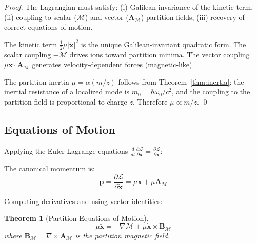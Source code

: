 \documentclass[twocolumn,10pt,a4paper]{article}
\newtheorem{theorem}{Theorem}[section]
\theoremstyle{definition}
\theoremstyle{remark}
\newcommand{\Depth}{\mathcal{M}}
\newcommand{\Lagr}{\mathcal{L}}
\newcommand{\Apartition}{\mathbf{A}_{\mathcal{M}}}
\newcommand{\partinert}{\mu}
\begin{document}
\begin{proof}
The Lagrangian must satisfy: (i) Galilean invariance of the kinetic term, (ii) coupling to scalar ($\Depth$) and vector ($\Apartition$) partition fields, (iii) recovery of correct equations of motion.

The kinetic term $\frac{1}{2}\partinert|\dot{\mathbf{x}}|^2$ is the unique Galilean-invariant quadratic form. The scalar coupling $-\Depth$ drives ions toward partition minima. The vector coupling $\partinert\dot{\mathbf{x}}\cdot\Apartition$ generates velocity-dependent forces (magnetic-like).

The partition inertia $\partinert = \alpha(m/z)$ follows from Theorem~\ref{thm:inertia}: the inertial resistance of a localized mode is $m_0 = \hbar\omega_0/c^2$, and the coupling to the partition field is proportional to charge $z$. Therefore $\partinert \propto m/z$. \qed
\end{proof}

\subsection{Equations of Motion}

Applying the Euler-Lagrange equations $\frac{d}{dt}\frac{\partial\Lagr}{\partial\dot{\mathbf{x}}} = \frac{\partial\Lagr}{\partial\mathbf{x}}$:

The canonical momentum is:
\begin{equation}
    \mathbf{p} = \frac{\partial\Lagr}{\partial\dot{\mathbf{x}}} = \partinert\dot{\mathbf{x}} + \partinert\Apartition
\end{equation}

Computing derivatives and using vector identities:

\begin{theorem}[Partition Equations of Motion]
\label{thm:eom}
\begin{equation}
    \boxed{\partinert\ddot{\mathbf{x}} = -\nabla\Depth + \partinert\dot{\mathbf{x}} \times \mathbf{B}_{\Depth}}
    \label{eq:eom}
\end{equation}
where $\mathbf{B}_{\Depth} = \nabla \times \Apartition$ is the partition magnetic field.
\end{theorem}
\end{document}

